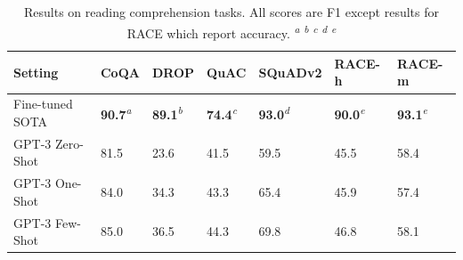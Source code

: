 \begin{table}
    \centering
    \begin{center}
        \begin{tabular}{lllllll}
        \toprule
        Setting & CoQA & DROP & QuAC & SQuADv2 & RACE-h & RACE-m\\ 
        \midrule
        Fine-tuned SOTA  & \textbf{90.7}\textsuperscript{\textit{a}} & \textbf{89.1}\textsuperscript{\textit{b}} & \textbf{74.4}\textsuperscript{\textit{c}} & \textbf{93.0}\textsuperscript{\textit{d}} & \textbf{90.0}\textsuperscript{\textit{e}} & \textbf{93.1}\textsuperscript{\textit{e}} \\ 
        GPT-3 Zero-Shot  & 81.5 & 23.6 & 41.5 & 59.5 & 45.5 & 58.4 \\
        GPT-3 One-Shot & 84.0 & 34.3 & 43.3 & 65.4 & 45.9 & 57.4 \\
        GPT-3 Few-Shot  & 85.0 & 36.5 & 44.3 & 69.8 & 46.8 & 58.1 \\
        \bottomrule
        \end{tabular}
        \end{center}
    \caption{Results on reading comprehension tasks. All scores are F1 except results for RACE which report accuracy. \textsuperscript{\textit{a}}\cite{ju2019technical} \textsuperscript{\textit{b}}\cite{dropsota} \textsuperscript{\textit{c}}\cite{quacsota} \textsuperscript{\textit{d}}\cite{squadv2sota} \textsuperscript{\textit{e}}\cite{shoeybi2019megatronlm} }
    \label{table:reading_comprehension}
\end{table}